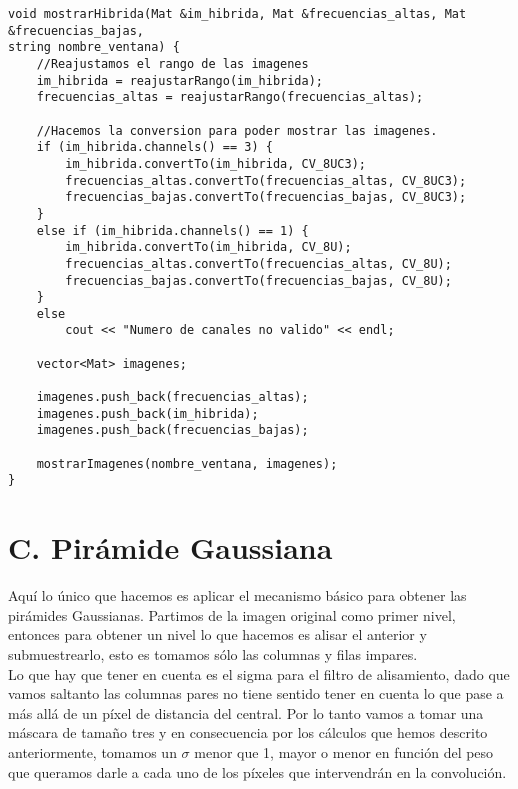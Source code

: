 \documentclass[10pt,a4paper]{article}
\begin{document}
\begin{lstlisting}
void mostrarHibrida(Mat &im_hibrida, Mat &frecuencias_altas, Mat &frecuencias_bajas,
string nombre_ventana) {
	//Reajustamos el rango de las imagenes
	im_hibrida = reajustarRango(im_hibrida);
	frecuencias_altas = reajustarRango(frecuencias_altas);

	//Hacemos la conversion para poder mostrar las imagenes.
	if (im_hibrida.channels() == 3) {
		im_hibrida.convertTo(im_hibrida, CV_8UC3);
		frecuencias_altas.convertTo(frecuencias_altas, CV_8UC3);
		frecuencias_bajas.convertTo(frecuencias_bajas, CV_8UC3);
	}
	else if (im_hibrida.channels() == 1) {
		im_hibrida.convertTo(im_hibrida, CV_8U);
		frecuencias_altas.convertTo(frecuencias_altas, CV_8U);
		frecuencias_bajas.convertTo(frecuencias_bajas, CV_8U);
	}
	else
		cout << "Numero de canales no valido" << endl;

	vector<Mat> imagenes;

	imagenes.push_back(frecuencias_altas);
	imagenes.push_back(im_hibrida);
	imagenes.push_back(frecuencias_bajas);

	mostrarImagenes(nombre_ventana, imagenes);
}
\end{lstlisting}

\section*{C. Pirámide Gaussiana}

Aquí lo único que hacemos es aplicar el mecanismo básico para obtener las pirámides Gaussianas. Partimos de la imagen original como primer nivel, entonces para obtener un nivel lo que hacemos es alisar el anterior y submuestrearlo, esto es tomamos sólo las columnas y filas impares.\\

Lo que hay que tener en cuenta es el sigma para el filtro de alisamiento, dado que vamos saltanto las columnas pares no tiene sentido tener en cuenta lo que pase a más allá de un píxel de distancia del central. Por lo tanto vamos a tomar una máscara de tamaño tres y en consecuencia por los cálculos que hemos descrito anteriormente, tomamos un $\sigma$ menor que 1, mayor o menor en función del peso que queramos darle a cada uno de los píxeles que intervendrán en la convolución.\\
\end{document}
